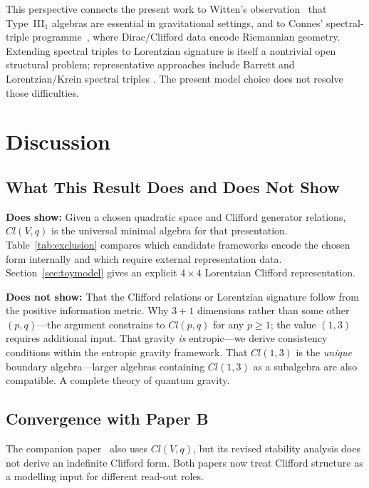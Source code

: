 \documentclass[12pt]{article}
\begin{document}
This perspective connects the present work to Witten's observation~\cite{Witten2018} that Type~III$_1$ algebras are essential in gravitational settings, and to Connes' spectral-triple programme~\cite{Connes1994}, where Dirac/Clifford data encode Riemannian geometry.  Extending spectral triples to Lorentzian signature is itself a nontrivial open structural problem; representative approaches include Barrett and Lorentzian/Krein spectral triples \cite{Barrett2007,PaschkeSitarz2006,VandenDungen2016}.  The present model choice does not resolve those difficulties.

\section{Discussion}
\label{sec:discussion}

\subsection{What This Result Does and Does Not Show}

\textbf{Does show:}
Given a chosen quadratic space and Clifford generator relations, $Cl(V,q)$ is the universal minimal algebra for that presentation.
Table~\ref{tab:exclusion} compares which candidate frameworks encode the chosen form internally and which require external representation data.
Section~\ref{sec:toymodel} gives an explicit $4\times4$ Lorentzian Clifford representation.

\textbf{Does not show:}
That the Clifford relations or Lorentzian signature follow from the positive information metric.
Why $3+1$ dimensions rather than some other $(p,q)$---the argument constrains to $Cl(p,q)$ for any $p \geq 1$; the value $(1,3)$ requires additional input.
That gravity \emph{is} entropic---we derive consistency conditions within the entropic gravity framework.
That $Cl(1,3)$ is the \emph{unique} boundary algebra---larger algebras containing $Cl(1,3)$ as a subalgebra are also compatible.
A complete theory of quantum gravity.

\subsection{Convergence with Paper B}

The companion paper~\cite{Liu2026QRAIF_B} also uses $Cl(V,q)$, but its revised stability analysis does not derive an indefinite Clifford form.  Both papers now treat Clifford structure as a modelling input for different read-out roles.
\end{document}
